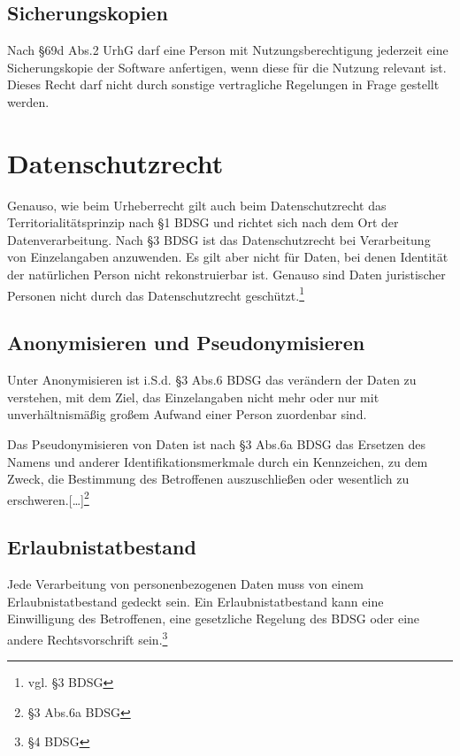 \subsection{Sicherungskopien}
Nach §69d Abs.2 UrhG darf eine Person mit Nutzungsberechtigung jederzeit eine Sicherungskopie der Software anfertigen, wenn diese f\"ur die Nutzung relevant ist. Dieses Recht darf nicht durch sonstige vertragliche Regelungen in Frage gestellt werden.
 \label{sicherungskopien}
\section{Datenschutzrecht}
Genauso, wie beim Urheberrecht gilt auch beim Datenschutzrecht das Territorialit\"atsprinzip nach §1 BDSG und richtet sich nach dem Ort der Datenverarbeitung. Nach §3 BDSG ist das Datenschutzrecht bei Verarbeitung von Einzelangaben anzuwenden. Es gilt aber nicht f\"ur Daten, bei denen Identit\"at der nat\"urlichen Person nicht rekonstruierbar ist. Genauso sind Daten juristischer Personen nicht durch das Datenschutzrecht gesch\"utzt.\footnote{vgl. §3 BDSG} 

\subsection{Anonymisieren und Pseudonymisieren}
Unter Anonymisieren ist i.S.d. §3 Abs.6 BDSG das ver\"andern der Daten zu verstehen, mit dem Ziel, das Einzelangaben nicht mehr oder nur mit unverh\"altnism\"a{\ss}ig gro{\ss}em Aufwand einer Person zuordenbar sind.\newline

Das Pseudonymisieren von Daten ist nach §3 Abs.6a BDSG {\glqq}das Ersetzen des Namens und anderer Identifikationsmerkmale durch ein Kennzeichen, zu dem Zweck, die Bestimmung des Betroffenen auszuschlie{\ss}en oder wesentlich zu erschweren.[…]{\grqq}\footnote{§3 Abs.6a BDSG} 
 \label{pseudonymisieren}
\subsection{Erlaubnistatbestand}
Jede Verarbeitung von personenbezogenen Daten muss von einem Erlaubnistatbestand gedeckt sein. Ein Erlaubnistatbestand kann eine Einwilligung des Betroffenen, eine gesetzliche Regelung des BDSG oder eine andere Rechtsvorschrift sein.\footnote{§4 BDSG}
 \label{erlaubnistatbestand}
